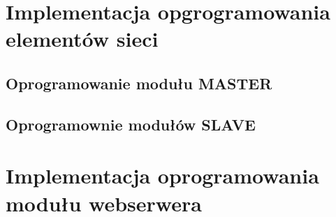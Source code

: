 \section{Implementacja opgrogramowania elementów sieci\label{sect:firmware-network}}

\subsection{Oprogramowanie modułu MASTER\label{sect:firmware-master}}

\subsection{Oprogramownie modułów SLAVE\label{sect:firmware-slave}}

\section{Implementacja oprogramowania modułu webserwera\label{sect:firmware-webserver}}

